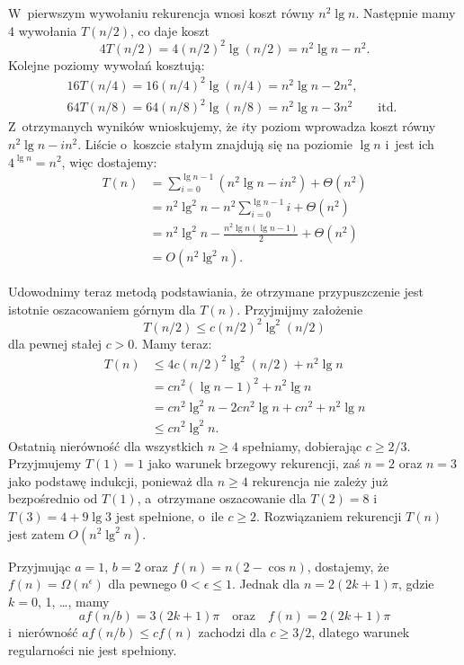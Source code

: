 W~pierwszym wywołaniu rekurencja wnosi koszt równy $n^2\lg n$.
Następnie mamy 4 wywołania $T(n/2)$, co daje koszt
\[
	4T(n/2) = 4(n/2)^2\lg(n/2) = n^2\lg n-n^2.
\]
Kolejne poziomy wywołań kosztują:
\begin{gather*}
	16T(n/4) = 16(n/4)^2\lg(n/4) = n^2\lg n-2n^2, \qquad\phantom{\text{itd.}} \\
	64T(n/8) = 64(n/8)^2\lg(n/8) = n^2\lg n-3n^2 \qquad\text{itd.}
\end{gather*}
Z~otrzymanych wyników wnioskujemy, że $i$\nbhyphen ty poziom wprowadza koszt równy $n^2\lg n-in^2$.
Liście o~koszcie stałym znajdują się na poziomie $\lg n$ i~jest ich $4^{\lg n}=n^2$, więc dostajemy:
\begin{align*}
	T(n) &= \sum_{i=0}^{\lg n-1}(n^2\lg n-in^2)+\Theta(n^2) \\
	&= n^2\lg^2n-n^2\sum_{i=0}^{\lg n-1}i+\Theta(n^2) \\[1mm]
	&= n^2\lg^2n-\frac{n^2\lg n(\lg n-1)}{2}+\Theta(n^2) \\[1mm]
	&= O(n^2\lg^2n).
\end{align*}

Udowodnimy teraz metodą podstawiania, że otrzymane przypuszczenie jest istotnie oszacowaniem górnym dla $T(n)$.
Przyjmijmy założenie
\[
	T(n/2) \le c(n/2)^2\lg^2(n/2)
\]
dla pewnej stałej $c>0$.
Mamy teraz:
\begin{align*}
	T(n) &\le 4c(n/2)^2\lg^2(n/2)+n^2\lg n \\
	&= cn^2(\lg n-1)^2+n^2\lg n \\
	&= cn^2\lg^2n-2cn^2\lg n+cn^2+n^2\lg n \\
	&\le cn^2\lg^2n.
\end{align*}
Ostatnią nierówność dla wszystkich $n\ge4$ spełniamy, dobierając $c\ge2/3$.
Przyjmujemy $T(1)=1$ jako warunek brzegowy rekurencji, zaś $n=2$ oraz $n=3$ jako podstawę indukcji, ponieważ dla $n\ge4$ rekurencja nie zależy już bezpośrednio od $T(1)$, a~otrzymane oszacowanie dla $T(2)=8$ i~$T(3)=4+9\lg3$ jest spełnione, o~ile $c\ge2$.
Rozwiązaniem rekurencji $T(n)$ jest zatem $O(n^2\lg^2n)$.

\exercise %
Przyjmując $a=1$, $b=2$ oraz $f(n)=n(2-\cos n)$, dostajemy, że $f(n)=\Omega(n^\epsilon)$ dla pewnego $0<\epsilon\le1$.
Jednak dla $n=2(2k+1)\pi$, gdzie $k=0$, 1, \dots, mamy
\[
	af(n/b) = 3(2k+1)\pi \quad\text{oraz}\quad f(n) = 2(2k+1)\pi
\]
i~nierówność $af(n/b)\le cf(n)$ zachodzi dla $c\ge3/2$, dlatego warunek regularności nie jest spełniony.
